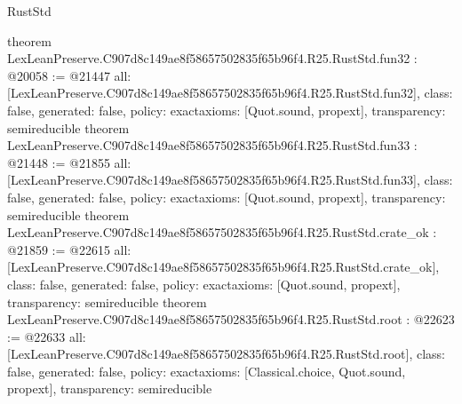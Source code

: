 \begin{lexlean}{RustStd}
\begin{coremodule}
{}
theorem LexLeanPreserve.C907d8c149ae8f58657502835f65b96f4.R25.RustStd.fun32 : @20058 := @21447 {
  all: [LexLeanPreserve.C907d8c149ae8f58657502835f65b96f4.R25.RustStd.fun32],
  class: false,
  generated: false,
  policy: exact{axioms: [Quot.sound, propext]},
  transparency: semireducible
}
theorem LexLeanPreserve.C907d8c149ae8f58657502835f65b96f4.R25.RustStd.fun33 : @21448 := @21855 {
  all: [LexLeanPreserve.C907d8c149ae8f58657502835f65b96f4.R25.RustStd.fun33],
  class: false,
  generated: false,
  policy: exact{axioms: [Quot.sound, propext]},
  transparency: semireducible
}
theorem LexLeanPreserve.C907d8c149ae8f58657502835f65b96f4.R25.RustStd.crate_ok : @21859 := @22615 {
  all: [LexLeanPreserve.C907d8c149ae8f58657502835f65b96f4.R25.RustStd.crate_ok],
  class: false,
  generated: false,
  policy: exact{axioms: [Quot.sound, propext]},
  transparency: semireducible
}
theorem LexLeanPreserve.C907d8c149ae8f58657502835f65b96f4.R25.RustStd.root : @22623 := @22633 {
  all: [LexLeanPreserve.C907d8c149ae8f58657502835f65b96f4.R25.RustStd.root],
  class: false,
  generated: false,
  policy: exact{axioms: [Classical.choice, Quot.sound, propext]},
  transparency: semireducible
}


\end{coremodule}
\end{lexlean}
